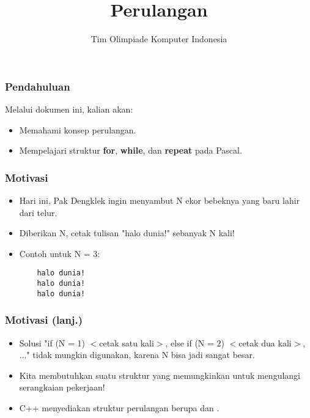 

\title{Perulangan}
\author{Tim Olimpiade Komputer Indonesia}
\date{}



\begin{frame}
\titlepage
\end{frame}

\begin{frame}
\frametitle{Pendahuluan}
Melalui dokumen ini, kalian akan:
\begin{itemize}
  \item Memahami konsep perulangan.
  \item Mempelajari struktur \textbf{for}, \textbf{while}, dan \textbf{repeat} pada Pascal.
\end{itemize}
\end{frame}

\begin{frame}[fragile]
\frametitle{Motivasi}
\begin{itemize}
  \item Hari ini, Pak Dengklek ingin menyambut N ekor bebeknya yang baru lahir dari telur.
  \item Diberikan N, cetak tulisan "halo dunia!" sebanyak N kali!
  \item Contoh untuk N = 3:
  \begin{lstlisting}
    halo dunia!
    halo dunia!
    halo dunia!
  \end{lstlisting}
\end{itemize}
\end{frame}

\begin{frame}
\frametitle{Motivasi (lanj.)}
\begin{itemize}
  \item Solusi "if (N = 1) $<$cetak satu kali$>$, else if (N = 2) $<$cetak dua kali$>$, ..." tidak mungkin digunakan, karena N bisa jadi sangat besar.
  \item Kita membutuhkan suatu struktur yang memungkinkan untuk mengulangi serangkaian pekerjaan!
  \item C++ menyediakan struktur perulangan berupa  dan .
\end{itemize}
\end{frame}


